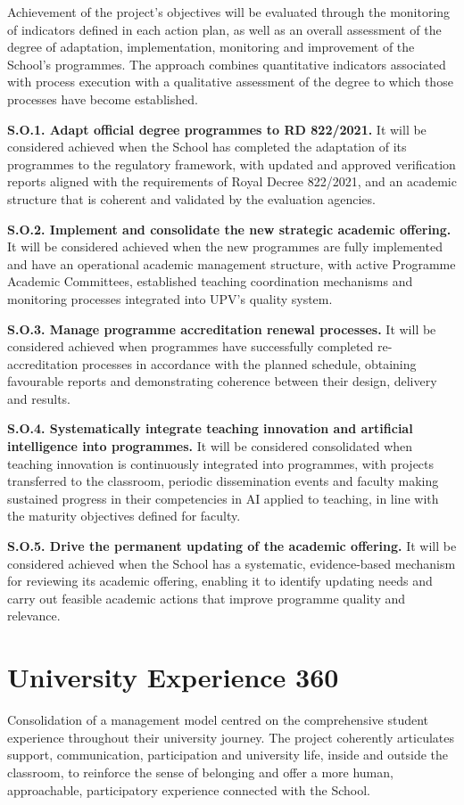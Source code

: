 \documentclass[11pt,a4paper]{scrreprt}
\begin{document}
\small
Achievement of the project's objectives will be evaluated through the monitoring of indicators defined in each action plan, as well as an overall assessment of the degree of adaptation, implementation, monitoring and improvement of the School's programmes. The approach combines quantitative indicators associated with process execution with a qualitative assessment of the degree to which those processes have become established.

\textbf{S.O.1. Adapt official degree programmes to RD 822/2021.} It will be considered achieved when the School has completed the adaptation of its programmes to the regulatory framework, with updated and approved verification reports aligned with the requirements of Royal Decree 822/2021, and an academic structure that is coherent and validated by the evaluation agencies.

\textbf{S.O.2. Implement and consolidate the new strategic academic offering.} It will be considered achieved when the new programmes are fully implemented and have an operational academic management structure, with active Programme Academic Committees, established teaching coordination mechanisms and monitoring processes integrated into UPV's quality system.

\textbf{S.O.3. Manage programme accreditation renewal processes.} It will be considered achieved when programmes have successfully completed re-accreditation processes in accordance with the planned schedule, obtaining favourable reports and demonstrating coherence between their design, delivery and results.

\textbf{S.O.4. Systematically integrate teaching innovation and artificial intelligence into programmes.} It will be considered consolidated when teaching innovation is continuously integrated into programmes, with projects transferred to the classroom, periodic dissemination events and faculty making sustained progress in their competencies in AI applied to teaching, in line with the maturity objectives defined for faculty.

\textbf{S.O.5. Drive the permanent updating of the academic offering.} It will be considered achieved when the School has a systematic, evidence-based mechanism for reviewing its academic offering, enabling it to identify updating needs and carry out feasible academic actions that improve programme quality and relevance.


\clearpage

\chapter[University Experience 360]{\textcolor{e360color}{University Experience 360}}
\begin{tcolorbox}[descbox]
\small Consolidation of a management model centred on the comprehensive student experience throughout their university journey. The project coherently articulates support, communication, participation and university life, inside and outside the classroom, to reinforce the sense of belonging and offer a more human, approachable, participatory experience connected with the School.
\end{tcolorbox}
\end{document}
